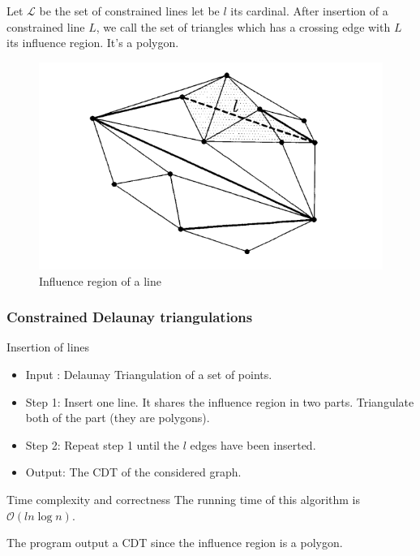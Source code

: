 \documentclass[10pt]{beamer}
\begin{document}
\begin{frame}
	Let $\mathcal{L}$ be the set of constrained lines let be $l$ its cardinal.
	After insertion of a constrained line $L$, we call the set of triangles which has a crossing edge with $L$ its influence region. It's a polygon.
	\begin{figure}[H]
		\centering
		\includegraphics[width=0.7\linewidth]{zone_inf_line}
		\caption{Influence region of a line}
		\label{fig:zoneinfline}
	\end{figure}
	
\end{frame}
\begin{frame}
	\frametitle{Constrained Delaunay triangulations}
	
	\begin{block}{Insertion of lines}
		\begin{itemize}
			\item Input : Delaunay Triangulation of a set of  points.
			\item Step 1: Insert one line. It shares the influence region in two parts. Triangulate both of the part (they are polygons).
			\item Step 2: Repeat step 1 until the $l$ edges have been inserted.  
			\item Output: The CDT of the considered graph.
		\end{itemize}
	\end{block}
\begin{block}{Time complexity and correctness}
	The running time of this algorithm is $\mathcal{O}(ln\log n)$.
	
	The program output a CDT since the influence region is a polygon. 
		\end{block}
\end{frame}
\end{document}
